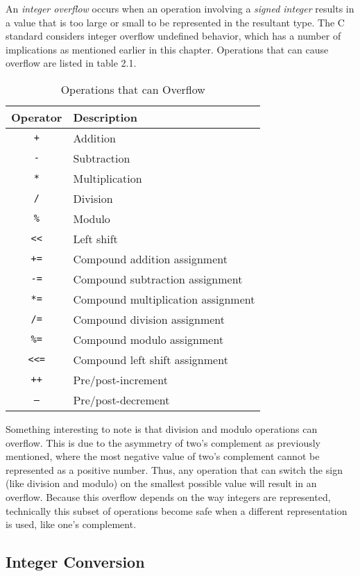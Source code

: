 An \textit{integer overflow} occurs when an operation involving a \textit{signed integer} results in a value that is too large or small to be represented in the resultant type. The C standard considers integer overflow undefined behavior, which has a number of implications as mentioned earlier in this chapter. Operations that can cause overflow are listed in table 2.1.
\begin{table}[h!]
\centering
\begin{tabular}{|c|l|}
\hline
\textbf{Operator} & \textbf{Description} \\
\hline
\texttt{+}        & Addition \\
\texttt{-}        & Subtraction \\
\texttt{*}        & Multiplication \\
\texttt{/}        & Division \\
\texttt{\%}       & Modulo \\
\texttt{<<}       & Left shift\\
\hline
\texttt{+=}       & Compound addition assignment \\
\texttt{-=}       & Compound subtraction assignment \\
\texttt{*=}       & Compound multiplication assignment \\
\texttt{/=}       & Compound division assignment \\
\texttt{\%=}      & Compound modulo assignment \\
\texttt{<<=}      & Compound left shift assignment \\
\hline
\texttt{++}       & Pre/post-increment \\
\texttt{--}       & Pre/post-decrement \\
\hline
\end{tabular}
\caption{Operations that can Overflow}
\end{table}

Something interesting to note is that division and modulo operations can overflow. This is due to the asymmetry of two's complement as previously mentioned, where the most negative value of two's complement cannot be represented as a positive number. Thus, any operation that can switch the sign (like division and modulo) on the smallest possible value will result in an overflow. Because this overflow depends on the way integers are represented, technically this subset of operations become safe when a different representation is used, like one's complement.

\subsection{Integer Conversion}

